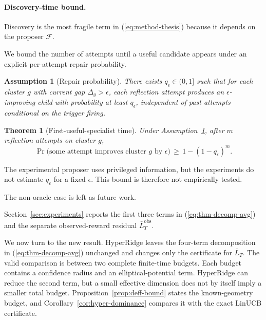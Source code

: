 \documentclass{article} %
\newtheorem{theorem}{Theorem}
\newtheorem{assumption}{Assumption}
\renewcommand{\eqref}[1]{\textup{(\ref{#1})}}
\begin{document}
\paragraph{Discovery-time bound.}

\label{sec:method-specialist}

Discovery is the most fragile term in \eqref{eq:method-thesis} because it depends on the proposer $\mathcal{F}$.

We bound the number of attempts until a useful candidate appears under an explicit per-attempt repair probability.

\begin{assumption}[Repair probability]
\label{ass:repair}
There exists $q_\epsilon \in (0,1]$ such that for each cluster $g$ with current gap $\Delta_g > \epsilon$, each reflection attempt produces an $\epsilon$-improving child with probability at least $q_\epsilon$, independent of past attempts conditional on the trigger firing.
\end{assumption}

\begin{theorem}[First-useful-specialist time]
\label{thm:specialist}
Under Assumption~\ref{ass:repair}, after $m$ reflection attempts on cluster $g$,
\begin{equation}
\label{eq:thm-specialist}
\Pr\bigl(\text{some attempt improves cluster } g \text{ by } \epsilon\bigr) \,\ge\, 1 - (1 - q_\epsilon)^m.
\end{equation}
\end{theorem}

The experimental proposer uses privileged information, but the experiments do not
estimate \(q_\epsilon\) for a fixed \(\epsilon\). This bound is therefore not
empirically tested.

The non-oracle case is left as future work.

Section~\ref{sec:experiments} reports the first three terms in
\eqref{eq:thm-decomp-avg} and the separate observed-reward residual
\(\bar L_T^{\mathrm{obs}}\).

We now turn to the new result. HyperRidge leaves the four-term decomposition
in \eqref{eq:thm-decomp-avg} unchanged and changes only the certificate for
$\bar L_T$. The valid
comparison is between two complete finite-time budgets. Each budget contains a
confidence radius and an elliptical-potential term. HyperRidge can reduce the
second term, but a small effective dimension does not by itself imply a smaller
total budget. Proposition~\ref{prop:deff-bound} states the known-geometry
budget, and Corollary~\ref{cor:hyper-dominance} compares it with the exact
LinUCB certificate.
\end{document}
